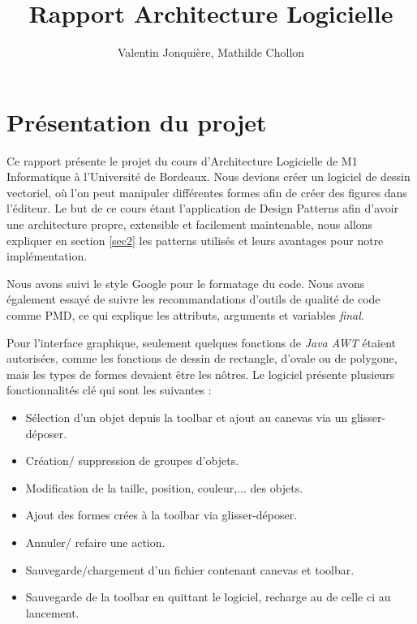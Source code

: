 \documentclass{article}
\author{
    Valentin Jonquière,
    Mathilde Chollon
}
\title{Rapport Architecture Logicielle}
\begin{document}
\maketitle

\pagebreak

\tableofcontents

\pagebreak

\section{Présentation du projet}

Ce rapport présente le projet du cours d'Architecture Logicielle de M1 Informatique à l'Université de Bordeaux.
Nous devions créer un logiciel de dessin vectoriel, où l'on peut manipuler différentes formes afin de créer des figures dans l'éditeur.
Le but de ce cours étant l'application de Design Patterns afin d'avoir une architecture propre, extensible et facilement maintenable, 
nous allons expliquer en section \ref{sec2} les patterns utilisés et leurs avantages pour notre implémentation.

Nous avons suivi le style Google pour le formatage du code.
Nous avons également essayé de suivre les recommandations d'outils de qualité de code comme PMD, ce qui explique les attributs, arguments et variables \textit{final}.

Pour l'interface graphique, seulement quelques fonctions de \textit{Java AWT} étaient autorisées, comme les fonctions de dessin de rectangle, d'ovale ou de polygone, mais les types de formes devaient
être les nôtres.
Le logiciel présente plusieurs fonctionnalités clé qui sont les suivantes :
\begin{itemize}
    \item Sélection d'un objet depuis la toolbar et ajout au canevas via un glisser-déposer.
    \item Création/ suppression de groupes d'objets.
    \item Modification de la taille, position, couleur,... des objets.
    \item Ajout des formes crées à la toolbar via glisser-déposer.
    \item Annuler/ refaire une action.
    \item Sauvegarde/chargement d'un fichier contenant canevas et toolbar.
    \item Sauvegarde de la toolbar en quittant le logiciel, recharge au de celle ci au lancement.
\end{itemize}
\end{document}
